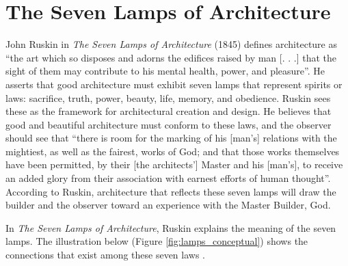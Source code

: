 \section{The Seven Lamps of Architecture}

John Ruskin in \textit{The Seven Lamps of Architecture} (1845) defines
architecture as ``the art which so disposes and adorns the edifices
raised by man [. . .] that the sight of them may contribute to his
mental health, power, and pleasure''\citep[][pp.~8]{ruskin1920}.  He asserts that
good architecture must exhibit seven lamps that represent spirits or
laws: sacrifice, truth, power, beauty, life, memory, and obedience. 
Ruskin sees these as the framework for architectural creation and
design.  He believes that good and beautiful architecture must conform
to these laws, and the observer should see that ``there is room for the
marking of his [man’s] relations with the mightiest, as well as the
fairest, works of God; and that those works themselves have been
permitted, by their [the architects’] Master and his [man’s], to
receive an added glory from their association with earnest efforts of
human thought''\citep[][pp.~73]{ruskin1920}.  According to Ruskin, architecture that reflects
these seven lamps will draw the builder and the observer toward an
experience with the Master Builder, God.  

In \textit{The Seven Lamps of Architecture}, Ruskin explains the
meaning of the seven lamps.  The illustration below (Figure \ref{fig:lamps_conceptual}) shows the
connections that exist among these seven laws \citep[][pp.~402]{baljon1997}.

